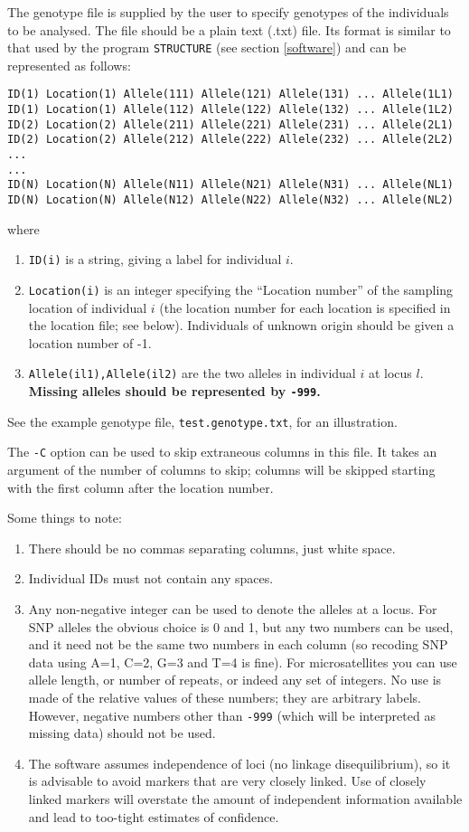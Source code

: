 \documentclass[10pt,titlepage,times,letterpaper]{article}
\begin{document}
The genotype file is supplied by the user to specify genotypes of the
individuals to be analysed. The file should be a plain text (.txt) file.
Its format is similar to that
used by the program {\tt STRUCTURE} (see section \ref{software})
and can be represented as follows:

\begin{verbatim}
ID(1) Location(1) Allele(111) Allele(121) Allele(131) ... Allele(1L1)
ID(1) Location(1) Allele(112) Allele(122) Allele(132) ... Allele(1L2)
ID(2) Location(2) Allele(211) Allele(221) Allele(231) ... Allele(2L1)
ID(2) Location(2) Allele(212) Allele(222) Allele(232) ... Allele(2L2)
...
...
ID(N) Location(N) Allele(N11) Allele(N21) Allele(N31) ... Allele(NL1)
ID(N) Location(N) Allele(N12) Allele(N22) Allele(N32) ... Allele(NL2)
\end{verbatim}
where
\begin{enumerate}
\item{\tt ID(i)} is a string, giving a label for individual $i$.
\item{\tt Location(i)} is an integer specifying the ``Location number'' of
the sampling location
of individual $i$ (the location number for each location 
is specified in the location file; see below). Individuals of unknown
origin should be given a location number of -1.
\item{{\tt Allele(il1),Allele(il2)}} are the two alleles in
individual $i$ at locus $l$. {\bf Missing alleles should
be represented by {\tt -999}.}
\end{enumerate}
See the example genotype file, {\tt test.genotype.txt}, for an illustration.

The {\tt -C} option can be used to skip extraneous columns in this
file.  It takes an argument of the number of columns to skip;
columns will be skipped starting with the first column after the location
number.

Some things to note:
\begin{enumerate}
\item There should be no commas separating columns, just white space.
\item Individual IDs must not contain any spaces.
\item Any non-negative integer can be used to denote the alleles at a locus.
For SNP alleles the obvious choice is 0 and 1, but any two numbers can be used,
and it need not be the same two numbers in each column (so recoding SNP data 
using A=1, C=2, G=3 and T=4 is fine).  For microsatellites you can use 
allele length, or number of repeats, or indeed any set of integers.  No use 
is made of the relative values of these numbers; they are arbitrary labels.
However, negative numbers other than {\tt -999} (which will be interpreted as
missing data) should not be used.
\item The software assumes independence of loci (no linkage disequilibrium),
so it is advisable to avoid markers that are very closely linked. 
Use of closely linked markers will overstate the amount of independent 
information available and lead to too-tight estimates of confidence.
\end{enumerate}
\end{document}
